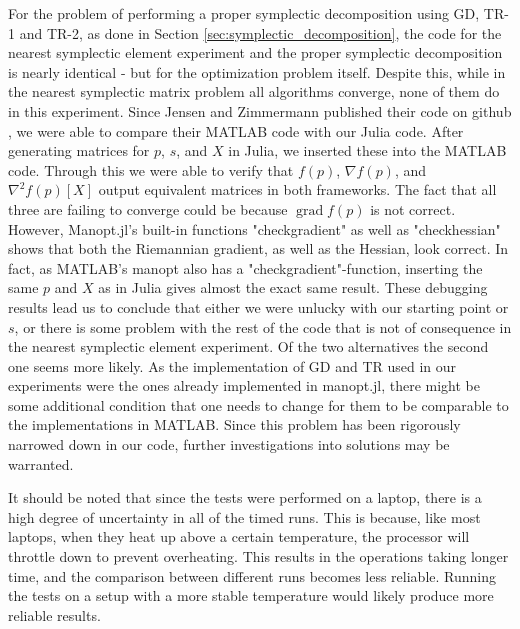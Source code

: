 For the problem of performing a proper symplectic decomposition using GD, TR-1 and TR-2, as done in Section \ref{sec:symplectic_decomposition}, the code for the nearest symplectic element experiment and the proper symplectic decomposition is nearly identical - but for the optimization problem itself. Despite this, while in the nearest symplectic matrix problem all algorithms converge, none of them do in this experiment. Since Jensen and Zimmermann published their code on github \cite[p.~15]{JensenZimmermann2024}, we were able to compare their MATLAB code with our Julia code. After generating matrices for $p$, $s$, and $X$ in Julia, we inserted these into the MATLAB code. Through this we were able to verify that $f(p)$, $\nabla f(p)$, and $\nabla^{2}f(p)[X]$ output equivalent matrices in both frameworks. The fact that all three are failing to converge could be because $\operatorname{grad}f(p)$ is not correct. However, Manopt.jl's built-in functions "checkgradient" as well as "checkhessian" shows that both the Riemannian gradient, as well as the Hessian, look correct. In fact, as MATLAB's manopt also has a "checkgradient"-function, inserting the same $p$ and $X$ as in Julia gives almost the exact same result. These debugging results lead us to conclude that either we were unlucky with our starting point or $s$, or there is some problem with the rest of the code that is not of consequence in the nearest symplectic element experiment. Of the two alternatives the second one seems more likely. As the implementation of GD and TR used in our experiments were the ones already implemented in manopt.jl, there might be some additional condition that one needs to change for them to be comparable to the implementations in MATLAB. Since this problem has been rigorously narrowed down in our code, further investigations into solutions may be warranted.

It should be noted that since the tests were performed on a laptop, there is a high degree of uncertainty in all of the timed runs. This is because, like most laptops, when they heat up above a certain temperature, the processor will throttle down to prevent overheating. This results in the operations taking longer time, and the comparison between different runs becomes less reliable. Running the tests on a setup with a more stable temperature would likely produce more reliable results. 

